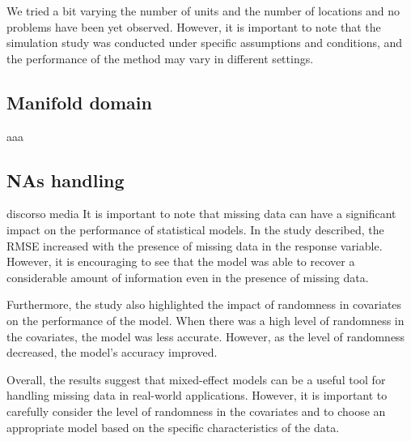 We tried a bit varying the number of units and the number of locations and no
problems have been yet observed. However, it is important to note that the
simulation study was conducted under specific assumptions and conditions, and
the performance of the method may vary in different settings.

\subsection{Manifold domain}
aaa
\subsection{NAs handling}
discorso media It is important to note that missing data can have a significant
impact on the performance of statistical models. In the study described, the
RMSE increased with the presence of missing data in the response variable.
However, it is encouraging to see that the model was able to recover a
considerable amount of information even in the presence of missing data.

Furthermore, the study also highlighted the impact of randomness in covariates
on the performance of the model. When there was a high level of randomness in
the covariates, the model was less accurate. However, as the level of
randomness decreased, the model's accuracy improved.

Overall, the results suggest that mixed-effect models can be a useful tool for
handling missing data in real-world applications. However, it is important to
carefully consider the level of randomness in the covariates and to choose an
appropriate model based on the specific characteristics of the data.

